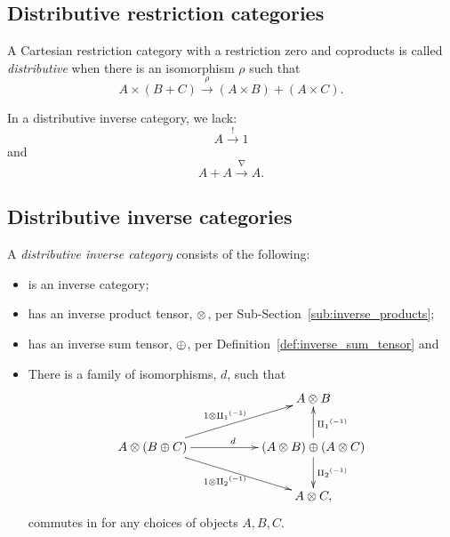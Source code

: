 \subsection{Distributive restriction categories} %
\label{sub:distributive_restriction_categories}


\begin{definition}
  A Cartesian restriction category with a restriction zero and coproducts is called
  \emph{distributive} when there is an isomorphism $\rho$ such that
  \[
    A\times (B+C) \xrightarrow{\rho} (A\times B) +(A\times C).
  \]
\end{definition}

In a distributive inverse category, we lack:
\[
  A  \xrightarrow{!} 1
\]
and
\[
  A+A \xrightarrow{\nabla} A.
\]

\subsection{Distributive inverse categories} %
\label{sub:distributive_inverse_categories}
%
\begin{definition}\label{def:distributive_inverse_category}
  A \emph{distributive inverse category} \D consists of the following:
  \begin{itemize}
    \item \D is an inverse category;
    \item \D has an inverse product tensor, $\otimes$, per Sub-Section~\ref{sub:inverse_products};
    \item \D has an inverse sum tensor, $\oplus$, per Definition~\ref{def:inverse_sum_tensor} and
    \item There is a family of isomorphisms, $d$, such that
    \begin{equation}
      \xymatrix{
      && A\*B\\
      A \* (B \+ C) \ar[rr]^{d} \ar[urr]^{1\*\icpa} \ar[drr]_{1\*\icpb}
        && (A\*B) \+ (A \* C) \ar[u]_{\icpa} \ar[d]^{\icpb}\\
      && A\*C,
      }\label{eq:inverse_distributive_laws}
    \end{equation}
    commutes in \D for any choices of objects $A, B, C$.
  \end{itemize}
\end{definition}


